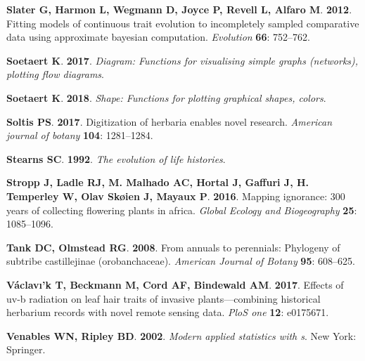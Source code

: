 \documentclass[man,floatsintext]{apa6}
\theoremstyle{definition}
\theoremstyle{definition}
\theoremstyle{definition}
\theoremstyle{remark}
\begin{document}
\leavevmode\hypertarget{ref-R-geiger_c}{}%
\textbf{\textnormal{Slater G}, \textnormal{Harmon L},
\textnormal{Wegmann D}, \textnormal{Joyce P}, \textnormal{Revell L},
\textnormal{Alfaro M}}. \textbf{2012}. Fitting models of continuous
trait evolution to incompletely sampled comparative data using
approximate bayesian computation. \emph{Evolution} \textbf{66}:
752--762.

\leavevmode\hypertarget{ref-R-diagram}{}%
\textbf{\textnormal{Soetaert K}}. \textbf{2017}. \emph{Diagram:
Functions for visualising simple graphs (networks), plotting flow
diagrams}.

\leavevmode\hypertarget{ref-R-shape}{}%
\textbf{\textnormal{Soetaert K}}. \textbf{2018}. \emph{Shape: Functions
for plotting graphical shapes, colors}.

\leavevmode\hypertarget{ref-soltis2017digitization}{}%
\textbf{\textnormal{Soltis PS}}. \textbf{2017}. Digitization of herbaria
enables novel research. \emph{American journal of botany} \textbf{104}:
1281--1284.

\leavevmode\hypertarget{ref-stearns1992evolution}{}%
\textbf{\textnormal{Stearns SC}}. \textbf{1992}. \emph{The evolution of
life histories}.

\leavevmode\hypertarget{ref-stropp2016mapping}{}%
\textbf{\textnormal{Stropp J}, \textnormal{Ladle RJ}, \textnormal{M.
Malhado AC}, \textnormal{Hortal J}, \textnormal{Gaffuri J},
\textnormal{H. Temperley W}, \textnormal{Olav Skøien J},
\textnormal{Mayaux P}}. \textbf{2016}. Mapping ignorance: 300 years of
collecting flowering plants in africa. \emph{Global Ecology and
Biogeography} \textbf{25}: 1085--1096.

\leavevmode\hypertarget{ref-tank2008annuals}{}%
\textbf{\textnormal{Tank DC}, \textnormal{Olmstead RG}}. \textbf{2008}.
From annuals to perennials: Phylogeny of subtribe castillejinae
(orobanchaceae). \emph{American Journal of Botany} \textbf{95}:
608--625.

\leavevmode\hypertarget{ref-vaclavik2017effects}{}%
\textbf{\textnormal{Václavı'k T}, \textnormal{Beckmann M},
\textnormal{Cord AF}, \textnormal{Bindewald AM}}. \textbf{2017}. Effects
of uv-b radiation on leaf hair traits of invasive plants---combining
historical herbarium records with novel remote sensing data. \emph{PloS
one} \textbf{12}: e0175671.

\leavevmode\hypertarget{ref-R-MASS}{}%
\textbf{\textnormal{Venables WN}, \textnormal{Ripley BD}}.
\textbf{2002}. \emph{Modern applied statistics with s}. New York:
Springer.
\end{document}
